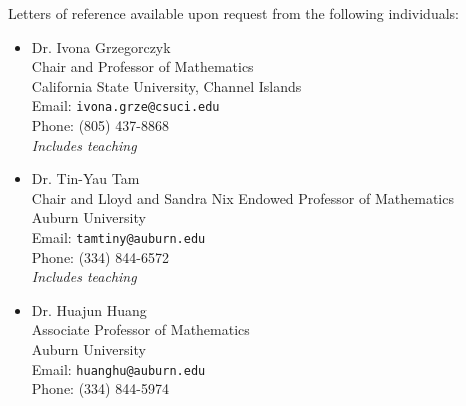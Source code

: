 \documentclass[11pt]{article}
\begin{document}

\makeletterhead

\maketitle

Letters of reference available upon request from the following
individuals:

\begin{itemize}
  \item{} Dr. Ivona Grzegorczyk\\
          Chair and Professor of Mathematics\\
          California State University, Channel Islands\\
          Email: \texttt{ivona.grze@csuci.edu}\\
          Phone: (805) 437-8868\\
          \emph{Includes teaching}
  \item{} Dr. Tin-Yau Tam\\
          Chair and Lloyd and Sandra Nix Endowed
          Professor of Mathematics\\
          Auburn University\\
          Email: \texttt{tamtiny@auburn.edu}\\
          Phone: (334) 844-6572\\
          \emph{Includes teaching}
  \item{} Dr. Huajun Huang\\
          Associate Professor of Mathematics\\
          Auburn University\\
          Email: \texttt{huanghu@auburn.edu}\\
          Phone: (334) 844-5974
\end{itemize}

\label{page:last}
\end{document}
